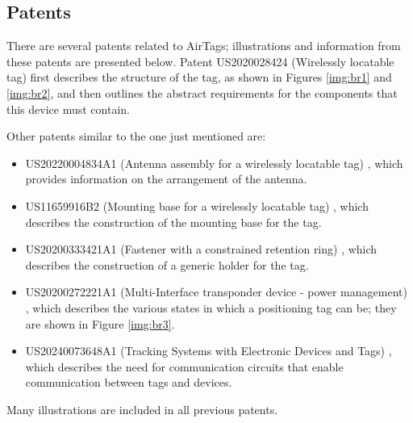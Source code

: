 \documentclass[english]{article}
\begin{document}
\subsection{Patents} 
There are several patents related to AirTags; illustrations and information from these patents are presented below. Patent US2020028424 (Wirelessly locatable tag) \cite{Perkins_Sano_Walton_Wang_Werner_Ashcroft_De_Hunter_Kim_Crosby_Jung_Schaevitz_Avendal_Da_Di_Nath_Papantonis_Graham_Thompson_Copeland_Ely_2022} first describes the structure of the tag, as shown in Figures \ref{img:br1} and \ref{img:br2}, and then outlines the abstract requirements for the components that this device must contain. 

Other patents similar to the one just mentioned are:
\begin{itemize}
\item US20220004834A1 (Antenna assembly for a wirelessly locatable tag) \cite{Perkins_Avendal_Da_Di_Nath_Papantonis_Schaevitz_Werner_2022}, which provides information on the arrangement of the antenna.
\item US11659916B2 (Mounting base for a wirelessly locatable tag) \cite{Perkins_Thompson_2023}, which describes the construction of the mounting base for the tag.
\item US20200333421A1 (Fastener with a constrained retention ring) \cite{Perkins_De_Hunter_2020}, which describes the construction of a generic holder for the tag.
\item US20200272221A1 (Multi-Interface transponder device - power management) \cite{Foster_Nilsen_Puskarich_2020}, which describes the various states in which a positioning tag can be; they are shown in Figure \ref{img:br3}.
\item US20240073648A1 (Tracking Systems with Electronic Devices and Tags) \cite{Puskarich_2024}, which describes the need for communication circuits that enable communication between tags and devices.
\end{itemize}
Many illustrations are included in all previous patents.
\end{document}
